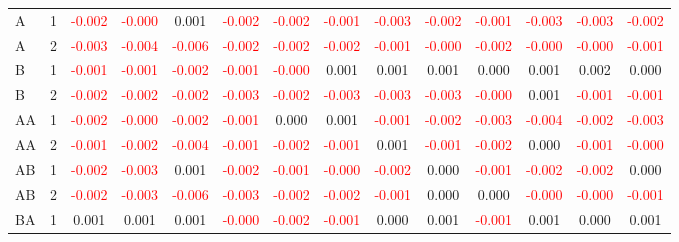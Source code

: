\begin{table}[!htb]
{\begin{tabular}{llcccccccccccc}
A & 1 & \textcolor{red}{-0.002} & \textcolor{red}{-0.000} & 0.001 & \textcolor{red}{-0.002} & \textcolor{red}{-0.002} & \textcolor{red}{-0.001} & \textcolor{red}{-0.003} & \textcolor{red}{-0.002} & \textcolor{red}{-0.001} & \textcolor{red}{-0.003} & \textcolor{red}{-0.003} & \textcolor{red}{-0.002}\\
A & 2 & \textcolor{red}{-0.003} & \textcolor{red}{-0.004} & \textcolor{red}{-0.006} & \textcolor{red}{-0.002} & \textcolor{red}{-0.002} & \textcolor{red}{-0.002} & \textcolor{red}{-0.001} & \textcolor{red}{-0.000} & \textcolor{red}{-0.002} & \textcolor{red}{-0.000} & \textcolor{red}{-0.000} & \textcolor{red}{-0.001}\\
B & 1 & \textcolor{red}{-0.001} & \textcolor{red}{-0.001} & \textcolor{red}{-0.002} & \textcolor{red}{-0.001} & \textcolor{red}{-0.000} & 0.001 & 0.001 & 0.001 & 0.000 & 0.001 & 0.002 & 0.000\\
B & 2 & \textcolor{red}{-0.002} & \textcolor{red}{-0.002} & \textcolor{red}{-0.002} & \textcolor{red}{-0.003} & \textcolor{red}{-0.002} & \textcolor{red}{-0.003} & \textcolor{red}{-0.003} & \textcolor{red}{-0.003} & \textcolor{red}{-0.000} & 0.001 & \textcolor{red}{-0.001} & \textcolor{red}{-0.001}\\
AA & 1 & \textcolor{red}{-0.002} & \textcolor{red}{-0.000} & \textcolor{red}{-0.002} & \textcolor{red}{-0.001} & 0.000 & 0.001 & \textcolor{red}{-0.001} & \textcolor{red}{-0.002} & \textcolor{red}{-0.003} & \textcolor{red}{-0.004} & \textcolor{red}{-0.002} & \textcolor{red}{-0.003}\\
AA & 2 & \textcolor{red}{-0.001} & \textcolor{red}{-0.002} & \textcolor{red}{-0.004} & \textcolor{red}{-0.001} & \textcolor{red}{-0.002} & \textcolor{red}{-0.001} & 0.001 & \textcolor{red}{-0.001} & \textcolor{red}{-0.002} & 0.000 & \textcolor{red}{-0.001} & \textcolor{red}{-0.000}\\
AB & 1 & \textcolor{red}{-0.002} & \textcolor{red}{-0.003} & 0.001 & \textcolor{red}{-0.002} & \textcolor{red}{-0.001} & \textcolor{red}{-0.000} & \textcolor{red}{-0.002} & 0.000 & \textcolor{red}{-0.001} & \textcolor{red}{-0.002} & \textcolor{red}{-0.002} & 0.000\\
AB & 2 & \textcolor{red}{-0.002} & \textcolor{red}{-0.003} & \textcolor{red}{-0.006} & \textcolor{red}{-0.003} & \textcolor{red}{-0.002} & \textcolor{red}{-0.002} & \textcolor{red}{-0.001} & 0.000 & 0.000 & \textcolor{red}{-0.000} & \textcolor{red}{-0.000} & \textcolor{red}{-0.001}\\
BA & 1 & 0.001 & 0.001 & 0.001 & \textcolor{red}{-0.000} & \textcolor{red}{-0.002} & \textcolor{red}{-0.001} & 0.000 & 0.001 & \textcolor{red}{-0.001} & 0.001 & 0.000 & 0.001\\

\end{tabular}}
\end{table}

